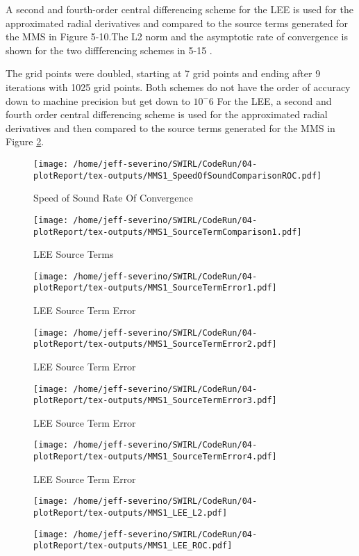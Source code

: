 A second and fourth-order central differencing scheme for the LEE is used for 
the approximated radial derivatives and compared to the source terms generated 
for the MMS in Figure 5-10.The L2 norm and the asymptotic rate of convergence 
is shown for the two diffferencing schemes in 5-15 . 

The grid points were doubled, starting at 7 grid points and ending after 9 iterations with 1025 grid points. Both schemes do not have the order of accuracy down to machine precision but get down to $10^-6$
For the LEE, a second and fourth order central differencing scheme is used
for the approximated radial derivatives and then compared to the source terms 
generated for the MMS in Figure \ref{fig:6}. 
\begin{figure}[h!]
    \centering
    \texttt{[image: /home/jeff-severino/SWIRL/CodeRun/04-plotReport/tex-outputs/MMS1\_SpeedOfSoundComparisonROC.pdf]}
    \caption{ Speed of Sound Rate Of Convergence}
    \label{fig:SpeedOfSoundROC}
\end{figure}



\begin{figure}[h!]
    \centering
    \texttt{[image: /home/jeff-severino/SWIRL/CodeRun/04-plotReport/tex-outputs/MMS1\_SourceTermComparison1.pdf]}
    \caption{LEE Source Terms}
    \label{fig:6}
\end{figure}


\begin{figure}[h!]
    \centering
    \texttt{[image: /home/jeff-severino/SWIRL/CodeRun/04-plotReport/tex-outputs/MMS1\_SourceTermError1.pdf]}
    \caption{LEE Source Term Error}
    \label{fig:7}
\end{figure}


\begin{figure}[h!]
    \centering
    \texttt{[image: /home/jeff-severino/SWIRL/CodeRun/04-plotReport/tex-outputs/MMS1\_SourceTermError2.pdf]}
    \caption{LEE Source Term Error}
    \label{fig:7}
\end{figure}


\begin{figure}[h!]
    \centering
    \texttt{[image: /home/jeff-severino/SWIRL/CodeRun/04-plotReport/tex-outputs/MMS1\_SourceTermError3.pdf]}
    \caption{LEE Source Term Error}
    \label{fig:7}
\end{figure}


\begin{figure}[h!]
    \centering
    \texttt{[image: /home/jeff-severino/SWIRL/CodeRun/04-plotReport/tex-outputs/MMS1\_SourceTermError4.pdf]}
    \caption{LEE Source Term Error}
    \label{fig:7}
\end{figure}


\begin{figure}[h!]
    \centering
    \texttt{[image: /home/jeff-severino/SWIRL/CodeRun/04-plotReport/tex-outputs/MMS1\_LEE\_L2.pdf]}
    \label{fig:9}
\end{figure}

\begin{figure}[h!]
    \centering
    \texttt{[image: /home/jeff-severino/SWIRL/CodeRun/04-plotReport/tex-outputs/MMS1\_LEE\_ROC.pdf]}
    \label{fig:9}
\end{figure}
